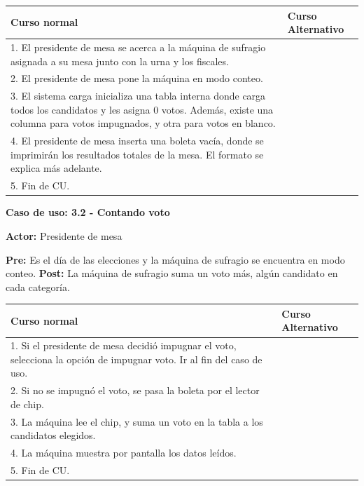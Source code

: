 \begin{table}[h!]
	
 \begin{tabular}{|p{7.5cm} | p{7.5cm}|} 
 \hline
 \textbf{Curso normal} & \textbf{Curso Alternativo} \\
 \hline


1. El presidente de mesa se acerca a la máquina de sufragio asignada a su mesa junto con la urna y los fiscales. & \\
\hline

2. El presidente de mesa pone la máquina en modo conteo. & \\
\hline

3. El sistema carga inicializa una tabla interna donde carga todos los candidatos y les asigna 0 votos. Además, existe una columna para votos impugnados, y otra para votos en blanco. & \\
\hline

4. El presidente de mesa inserta una boleta vacía, donde se imprimirán los resultados totales de la mesa. El formato se explica más adelante. & \\
\hline

5. Fin de CU. & \\
\hline

\end{tabular}
\end{table}


\textbf{Caso de uso: 3.2 - Contando voto}

\textbf{Actor:} Presidente de mesa

\textbf{Pre:} Es el día de las elecciones y la máquina de sufragio se encuentra en modo conteo.
\textbf{Post:} La máquina de sufragio suma un voto más, algún candidato en cada categoría.
\begin{table}[h!]
	
 \begin{tabular}{|p{7.5cm} | p{7.5cm}|} 
 \hline
 \textbf{Curso normal} & \textbf{Curso Alternativo} \\
 \hline


1. Si el presidente de mesa decidió impugnar el voto, selecciona la opción de impugnar voto. Ir al fin del caso de uso. & \\

\hline

2. Si no se impugnó el voto, se pasa la boleta por el lector de chip. & \\

\hline


3. La máquina lee el chip, y suma un voto en la tabla a los candidatos elegidos. & \\

\hline

4. La máquina muestra por pantalla los datos leídos. & \\

\hline

5. Fin de CU. & \\
\hline
\end{tabular}
\end{table}


